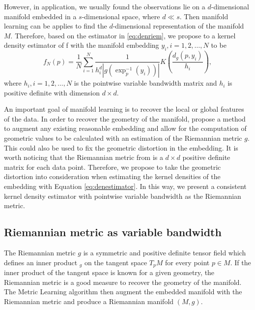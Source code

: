 \documentclass[11pt,a4paper,]{article}
\begin{document}
However, in application, we usually found the observations lie on a
\(d\)-dimensional manifold embedded in a \(s\)-dimensional space, where
\(d \ll s\). Then manifold learning can be applies to find the
\(d\)-dimensional representation of the manifold \(M\). Therefore, based on
the estimator in \eqref{eq:denriem}, we propose to a kernel density
estimator of f with the manifold embedding \(y_i, i = 1, 2, \dots, N\) to
be \begin{equation}
\label{eq:denestimator}
f_N(p) = \frac{1}{N} \sum_{i=1}^{N} \frac{1}{h_i^d |g(\exp_p^{-1}(y_i))|} K(\frac{d_g(p, y_i)}{h_i}),
\end{equation} where \(h_i, i = 1, 2, \dots, N\) is the pointwise variable
bandwidth matrix and \(h_i\) is positive definite with dimension
\(d\times d\).

An important goal of manifold learning is to recover the local or global
features of the data. In order to recover the geometry of the manifold,
\textcite{Perrault-Joncas2013-pq} propose a method to augment any existing
reasonable embedding and allow for the computation of geometric values
to be calculated with an estimation of the Riemannian metric \(g\). This
could also be used to fix the geometric distortion in the embedding. It
is worth noticing that the Riemannian metric from
\textcite{Perrault-Joncas2013-pq} is a \(d\times d\) positive definite matrix for
each data point. Therefore, we propose to take the geometric distortion
into consideration when estimating the kernel densities of the embedding
with Equation \eqref{eq:denestimator}. In this way, we present a
consistent kernel density estimator with pointwise variable bandwidth as
the Riemannian metric.

\hypertarget{riemannian-metric-as-variable-bandwidth}{%
\subsection{Riemannian metric as variable bandwidth}\label{riemannian-metric-as-variable-bandwidth}}

The Riemannian metric \(g\) is a symmetric and positive definite tensor
field which defines an inner product \(<,>_g\) on the tangent space \(T_pM\)
for every point \(p \in M\). If the inner product of the tangent space is
known for a given geometry, the Riemannian metric is a good measure to
recover the geometry of the manifold. The Metric Learning algorithm
\autocite{Perrault-Joncas2013-pq} then augment the embedded manifold with the
Riemannian metric and produce a Riemannian manifold \((M, g)\).
\end{document}
